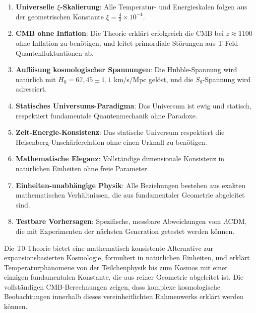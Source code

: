 	\begin{enumerate}
		\item \textbf{Universelle $\xi$-Skalierung}: Alle Temperatur- und Energieskalen folgen aus der geometrischen Konstante $\xi = \frac{4}{3} \times 10^{-4}$.
		
		\item \textbf{CMB ohne Inflation}: Die Theorie erklärt erfolgreich die CMB bei $z \approx 1100$ ohne Inflation zu benötigen, und leitet primordiale Störungen aus T-Feld-Quantenfluktuationen ab.
		
		\item \textbf{Auflösung kosmologischer Spannungen}: Die Hubble-Spannung wird natürlich mit $H_0 = 67,45 \pm 1,1$ km/s/Mpc gelöst, und die $S_8$-Spannung wird adressiert.
		
		\item \textbf{Statisches Universums-Paradigma}: Das Universum ist ewig und statisch, respektiert fundamentale Quantenmechanik ohne Paradoxe.
		
		\item \textbf{Zeit-Energie-Konsistenz}: Das statische Universum respektiert die Heisenberg-Unschärferelation ohne einen Urknall zu benötigen.
		
		\item \textbf{Mathematische Eleganz}: Vollständige dimensionale Konsistenz in natürlichen Einheiten ohne freie Parameter.
		
		\item \textbf{Einheiten-unabhängige Physik}: Alle Beziehungen bestehen aus exakten mathematischen Verhältnissen, die aus fundamentaler Geometrie abgeleitet sind.
		
		\item \textbf{Testbare Vorhersagen}: Spezifische, messbare Abweichungen vom $\Lambda$CDM, die mit Experimenten der nächsten Generation getestet werden können.
	\end{enumerate}
	
	\begin{revolutionary}
		Die T0-Theorie bietet eine mathematisch konsistente Alternative zur expansionsbasierten Kosmologie, formuliert in natürlichen Einheiten, und erklärt Temperaturphänomene von der Teilchenphysik bis zum Kosmos mit einer einzigen fundamentalen Konstante, die aus reiner Geometrie abgeleitet ist. Die vollständigen CMB-Berechnungen zeigen, dass komplexe kosmologische Beobachtungen innerhalb dieses vereinheitlichten Rahmenwerks erklärt werden können.
	\end{revolutionary}
	

